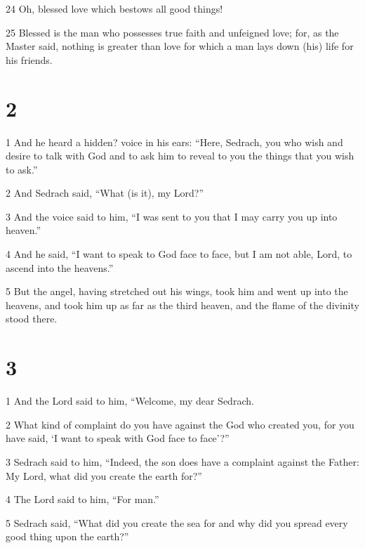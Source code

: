 \par 24 Oh, blessed love which bestows all good things! 

\par 25 Blessed is the man who possesses true faith and unfeigned love; for, as the Master said, nothing is greater than love for which a man lays down (his) life for his friends. 

\chapter{2}

\par 1 And he heard a hidden? voice in his ears: “Here, Sedrach, you who wish and desire to talk with God and to ask him to reveal to you the things that you wish to ask.” 

\par 2 And Sedrach said, “What (is it), my Lord?” 

\par 3 And the voice said to him, “I was sent to you that I may carry you up into heaven.” 

\par 4 And he said, “I want to speak to God face to face, but I am not able, Lord, to ascend into the heavens.” 

\par 5 But the angel, having stretched out his wings, took him and went up into the heavens, and took him up as far as the third heaven, and the flame of the divinity stood there. 

\chapter{3}

\par 1 And the Lord said to him, “Welcome, my dear Sedrach. 

\par 2 What kind of complaint do you have against the God who created you, for you have said, ‘I want to speak with God face to face’?” 

\par 3 Sedrach said to him, “Indeed, the son does have a complaint against the Father: My Lord, what did you create the earth for?” 

\par 4 The Lord said to him, “For man.” 

\par 5 Sedrach said, “What did you create the sea for and why did you spread every good thing upon the earth?” 

